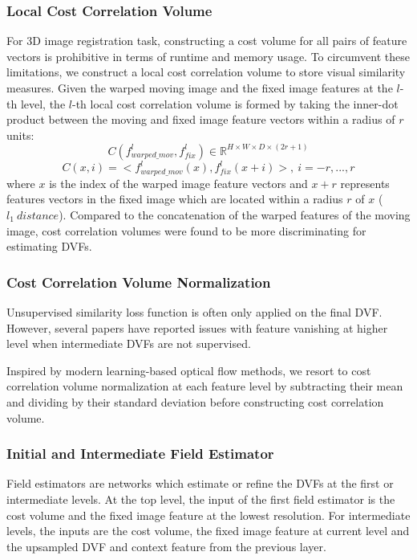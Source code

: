 \documentclass[runningheads]{llncs}
\begin{document}
\subsubsection{Local Cost Correlation Volume}
For 3D image registration task, constructing a cost volume for all pairs of feature vectors is prohibitive in terms of runtime and memory usage. To circumvent these limitations, we construct a local cost correlation volume to store visual similarity measures. Given the warped moving image and the fixed image features at the $l$-th level, the $l$-th local cost correlation volume is formed by taking the inner-dot product between the moving and fixed image feature vectors within a radius of $r$ units:
\begin{equation}
C(f^{l}_{warped\_mov}, f^{l}_{fix})\in \mathbb{R}^{H\times W \times D \times (2r+1)}
\end{equation}
\begin{equation}
C(x,i) = <f^{l}_{warped\_mov}(x),f^{l}_{fix}(x+i)>,\ i=-r,...,r
\end{equation}\label{EQ-CC}
where $x$ is the index of the warped image feature vectors and $x+r$ represents features vectors in the fixed image which are located within a radius $r$ of $x$ ($l_1 \ distance$). 
Compared to the concatenation of the warped features of the moving image, cost correlation volumes were found to be more discriminating for estimating DVFs. 

\subsubsection{Cost Correlation Volume Normalization}
Unsupervised similarity loss function is often only applied on the final DVF. However, several papers \cite{jonschkowskiWhatMattersUnsupervised2020,sunPWCNetCNNsOptical2018} have reported issues with feature vanishing at higher level when intermediate DVFs are not supervised.

Inspired by modern learning-based optical flow methods, we resort to cost correlation volume normalization 
at each feature level by subtracting their mean and dividing by their standard deviation before constructing cost correlation volume.

\subsubsection{Initial and Intermediate Field Estimator}
Field estimators are networks which estimate or refine the DVFs at the first or intermediate levels. At the top level, the input of the first field estimator is the cost volume and the fixed image feature at the lowest resolution. For intermediate levels, the inputs are the cost volume, the fixed image feature at current level and the upsampled DVF and context feature from the previous layer.
\end{document}
